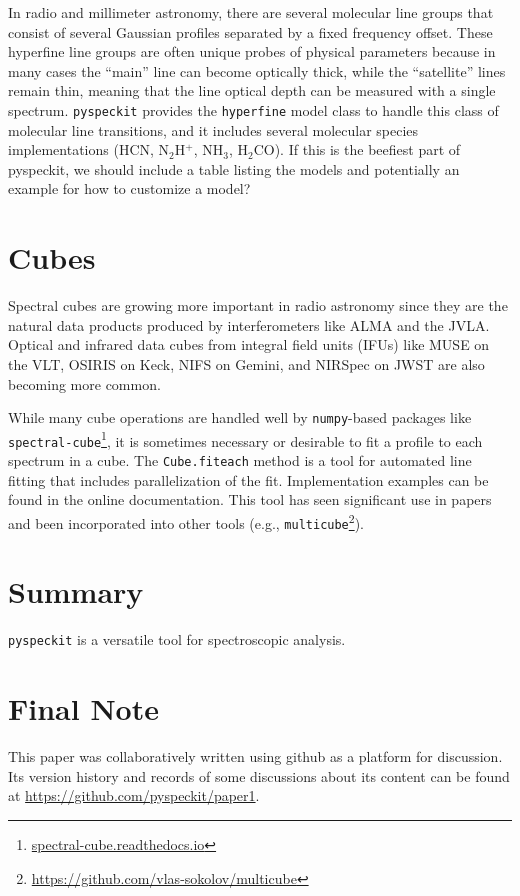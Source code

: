 \documentclass[twocolumn]{aastex62}
\newcommand{\pyspeckit}{\texttt{pyspeckit}\xspace}
\begin{document}
In radio and millimeter astronomy, there are several molecular line groups that
consist of several Gaussian profiles separated by a fixed frequency offset.
These hyperfine line groups are often unique probes of physical parameters
because in many cases the ``main'' line can become optically thick, while the
``satellite'' lines remain thin, meaning that the line optical depth can be
measured with a single spectrum.  \pyspeckit provides the \texttt{hyperfine}
model class to handle this class of molecular line transitions, and it includes
several molecular species implementations (HCN, N$_2$H$^+$, NH$_3$,
H$_2$CO). {\color{red}If this is the beefiest part of pyspeckit, we should include a table
listing the models and potentially an example for how to customize a model?}

\section{Cubes}
\label{sec:cubes}
Spectral cubes are growing more important in radio astronomy since they are the
natural data products produced by interferometers like ALMA and the JVLA.
Optical and infrared data cubes from integral field units (IFUs) like MUSE on
the VLT, OSIRIS on Keck,  NIFS on Gemini, and NIRSpec on JWST are also becoming
more common.

While many cube operations are handled well by \texttt{numpy}-based packages
like \texttt{spectral-cube}\footnote{\url{spectral-cube.readthedocs.io}},
it is sometimes necessary or desirable to fit a profile to each spectrum
in a cube.  The \texttt{Cube.fiteach} method is a tool for automated line
fitting that includes parallelization of the fit. Implementation examples can be
found in the online documentation. This tool  has  seen significant use in
papers and been incorporated into other tools (e.g.,
\texttt{multicube}\footnote{\url{https://github.com/vlas-sokolov/multicube}}).

\section{Summary}
\texttt{pyspeckit} is a versatile tool for spectroscopic analysis.

\section{Final Note}
This paper was collaboratively written using github as a platform for
discussion.  Its version history and records of some discussions about its
content can be found at \url{https://github.com/pyspeckit/paper1}.
\end{document}
